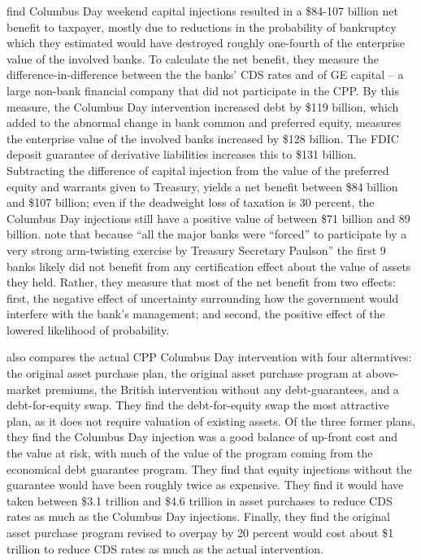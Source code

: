 \documentclass[12pt]{article}
\begin{document}
\citet{Gift} find Columbus Day weekend capital injections resulted in a \$84-107 billion net benefit to taxpayer, mostly due to reductions in the probability of bankruptcy which they estimated would have destroyed roughly one-fourth of the enterprise value of the involved banks. To calculate the net benefit, they measure the difference-in-difference between the the banks' CDS rates and of GE capital -- a large non-bank financial company that did not participate in the CPP. By this measure, the Columbus Day intervention increased debt by \$119 billion, which added to the abnormal change in bank common and preferred equity, measures the enterprise value of the involved banks increased by \$128 billion. The FDIC deposit guarantee of derivative liabilities increases this to \$131 billion. Subtracting the difference of capital injection from the value of the preferred equity and warrants given to Treasury, yields a net benefit between \$84 billion and \$107 billion; even if the deadweight loss of taxation is 30 percent, the Columbus Day injections still have a positive value of between \$71 billion and 89 billion. \citet{Gift} note that because ``all the major banks were ``forced'' to participate by a very strong arm-twisting exercise by Treasury Secretary Paulson'' the first 9 banks likely did not benefit from any certification effect about the value of assets they held. Rather, they measure that most of the net benefit from two effects: first, the negative effect of uncertainty surrounding how the government would interfere with the bank's management; and second, the positive effect of the lowered likelihood of probability. 

\citet{Gift} also compares the actual CPP Columbus Day intervention with four alternatives: the original asset purchase plan, the original asset purchase program at above-market premiums, the British intervention without any debt-guarantees, and a debt-for-equity swap. They find the debt-for-equity swap the most attractive plan, as it does not require valuation of existing assets. Of the three former plans, they find the Columbus Day injection was a good balance of up-front cost and the value at risk, with much of the value of the program coming from the economical debt guarantee program. They find that equity injections without the guarantee would have been roughly twice as expensive. They find it would have taken between \$3.1 trillion and \$4.6 trillion in asset purchases to reduce CDS rates as much as the Columbus Day injections. Finally, they find the original asset purchase program revised to overpay by 20 percent would cost about \$1 trillion to reduce CDS rates as much as the actual intervention. 
\end{document}
